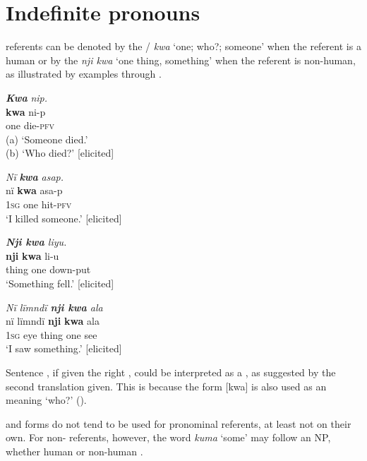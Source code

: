 \section{Indefinite pronouns}\label{sec:6.4}


 referents can be denoted by the / \textit{kwa} ‘one; who?; someone’ when the referent is a human or by the  \textit{nji kwa} ‘one thing, something’ when the referent is non-human, as illustrated by examples  through .

\ea%
    \label{ex:pron:37}
          \textbf{\textit{Kwa}} \textit{nip.}\\
\gll    \textbf{kwa}  ni-p\\
    one    die-\textsc{pfv}\\
\glt    (a) ‘Someone died.’\\
    (b) ‘Who died?’ [elicited]
\z

\ea%
    \label{ex:pron:38}
          \textit{Nï} \textbf{\textit{kwa}} \textit{asap.}\\
\gll nï    \textbf{kwa}  asa-p\\
    \textsc{1sg}  one    hit-\textsc{pfv}\\
\glt `I killed someone.’ [elicited]
\z

\ea%
    \label{ex:pron:39}
          \textit{\textbf{Nji kwa} liyu.}\\
\gll    \textbf{nji}    \textbf{kwa}  li-u\\
    thing  one    down-put\\
\glt `Something fell.’ [elicited]
\z

\ea%
    \label{ex:pron:40}
         \textit{Nï lïmndï \textbf{nji kwa} ala}\\
\gll nï    lïmndï  \textbf{nji}    \textbf{kwa}  ala\\
    \textsc{1sg}  eye    thing  one    see\\
\glt `I saw something.’ [elicited]
\z

Sentence , if given the right , could be interpreted as a , as suggested by the second translation given. This is because the form [kwa] is also used as an  meaning ‘who?’ ().

   and  forms do not tend to be used for  pronominal referents, at least not on their own. For non-  referents, however, the word \textit{kuma} ‘some’ may follow an NP, whether human  or non-human .

